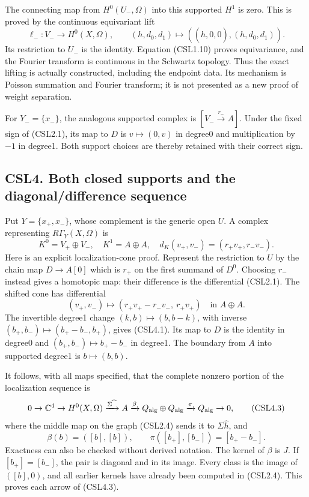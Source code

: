 The connecting map from \(H^0(U_-,\Omega)\) into this supported \(H^1\)
is zero. This is proved by the continuous equivariant lift \[
\ell_-:V_-\longrightarrow H^0(X,\Omega),\qquad
(h,d_0,d_1)\longmapsto
((\widehat h,0,0),(h,d_0,d_1)).
\tag{CSL3.4}
\] Its restriction to \(U_-\) is the identity. Equation (CSL1.10) proves
equivariance, and the Fourier transform is continuous in the Schwartz
topology. Thus the exact lifting is actually constructed, including the
endpoint data. Its mechanism is Poisson summation and Fourier transform;
it is not presented as a new proof of weight separation.

For \(Y_-=\{x_-\}\), the analogous supported complex is
\([V_-\xrightarrow{r_-}A]\). Under the fixed sign of (CSL2.1), its map
to \(D\) is \(v\mapsto(0,v)\) in degree0 and multiplication by \(-1\) in
degree1. Both support choices are thereby retained with their correct
sign.

\subsection{CSL4. Both closed supports and the diagonal/difference
sequence}\label{csl4.-both-closed-supports-and-the-diagonaldifference-sequence}

Put \(Y=\{x_+,x_-\}\), whose complement is the generic open \(U\). A
complex representing \(R\Gamma_Y(X,\Omega)\) is \[
K^0=V_+\oplus V_-,\quad K^1=A\oplus A,\quad
d_K(v_+,v_-)=(r_+v_+,r_-v_-).
\tag{CSL4.1}
\] Here is an explicit localization-cone proof. Represent the
restriction to \(U\) by the chain map \(D\to A[0]\) which is \(r_+\) on
the first summand of \(D^0\). Choosing \(r_-\) instead gives a homotopic
map: their difference is the differential (CSL2.1). The shifted cone has
differential \[
(v_+,v_-)\longmapsto
(r_+v_+-r_-v_-,\ r_+v_+)
\quad\text{in }A\oplus A.
\tag{CSL4.2}
\] The invertible degree1 change \((k,b)\mapsto(b,b-k)\), with inverse
\((b_+,b_-)\mapsto(b_+-b_-,b_+)\), gives (CSL4.1). Its map to \(D\) is
the identity in degree0 and \((b_+,b_-)\mapsto b_+-b_-\) in degree1. The
boundary from \(A\) into supported degree1 is \(b\mapsto(b,b)\).

It follows, with all maps specified, that the complete nonzero portion
of the localization sequence is \[
0\to\mathbb C^4\to H^0(X,\Omega)\xrightarrow{\Sigma\widehat{\phantom h}}A
\xrightarrow{\beta}Q_{\rm alg}\oplus Q_{\rm alg}
\xrightarrow{\pi}Q_{\rm alg}\to0,
\tag{CSL4.3}
\] where the middle map on the graph (CSL2.4) sends it to
\(\Sigma\widehat h\), and \[
\beta(b)=([b],[b]),\qquad \pi([b_+],[b_-])=[b_+-b_-].
\tag{CSL4.4}
\] Exactness can also be checked without derived notation. The kernel of
\(\beta\) is \(J\). If \([b_+]=[b_-]\), the pair is diagonal and in its
image. Every class is the image of \(([b],0)\), and all earlier kernels
have already been computed in (CSL2.4). This proves each arrow of
(CSL4.3).

